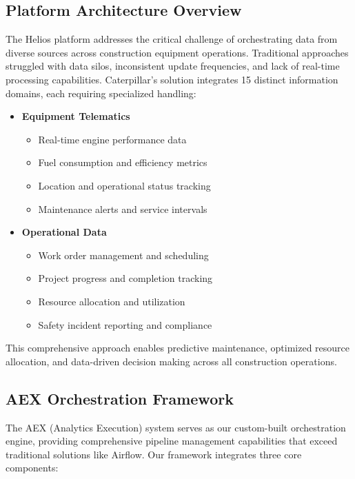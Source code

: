 \documentclass[12pt, a4paper]{article} %
\begin{document}
\subsection{Platform Architecture Overview}
The Helios platform addresses the critical challenge of orchestrating data from diverse sources across construction equipment operations. Traditional approaches struggled with data silos, inconsistent update frequencies, and lack of real-time processing capabilities. Caterpillar's solution integrates 15 distinct information domains, each requiring specialized handling:

\begin{itemize}
    \item \textbf{Equipment Telematics}
    \begin{itemize}
        \item Real-time engine performance data
        \item Fuel consumption and efficiency metrics
        \item Location and operational status tracking
        \item Maintenance alerts and service intervals
    \end{itemize}
    
    \item \textbf{Operational Data}
    \begin{itemize}
        \item Work order management and scheduling
        \item Project progress and completion tracking
        \item Resource allocation and utilization
        \item Safety incident reporting and compliance
    \end{itemize}
\end{itemize}

This comprehensive approach enables predictive maintenance, optimized resource allocation, and data-driven decision making across all construction operations.


\subsection{AEX Orchestration Framework}

The AEX (Analytics Execution) system serves as our custom-built orchestration engine, providing comprehensive pipeline management capabilities that exceed traditional solutions like Airflow. Our framework integrates three core components:
\end{document}

